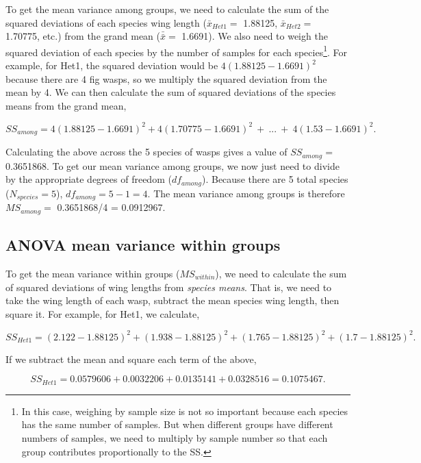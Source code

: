 \documentclass[
]{scrbook}
\begin{document}
To get the mean variance among groups, we need to calculate the sum of the squared deviations of each species wing length (\(\bar{x}_{Het1} =\) 1.88125, \(\bar{x}_{Het2} =\) 1.70775, etc.) from the grand mean (\(\bar{\bar{x}} =\) 1.6691).
We also need to weigh the squared deviation of each species by the number of samples for each species\footnote{In this case, weighing by sample size is not so important because each species has the same number of samples. But when different groups have different numbers of samples, we need to multiply by sample number so that each group contributes proportionally to the SS.}.
For example, for Het1, the squared deviation would be \(4(1.88125 - 1.6691)^{2}\) because there are 4 fig wasps, so we multiply the squared deviation from the mean by 4.
We can then calculate the sum of squared deviations of the species means from the grand mean,

\[SS_{among} = 4(1.88125 - 1.6691)^{2} + 
               4(1.70775 - 1.6691)^{2}\:+\: ... \:
               +\:4(1.53 - 1.6691)^{2}.\]

Calculating the above across the 5 species of wasps gives a value of \(SS_{among} =\) 0.3651868.
To get our mean variance among groups, we now just need to divide by the appropriate degrees of freedom (\(df_{among}\)).
Because there are 5 total species (\(N_{species} = 5\)), \(df_{among} = 5 - 1 = 4\).
The mean variance among groups is therefore \(MS_{among} =\) 0.3651868/4 = 0.0912967.

\hypertarget{anova-mean-variance-within-groups}{%
\subsection{ANOVA mean variance within groups}\label{anova-mean-variance-within-groups}}

To get the mean variance within groups (\(MS_{within}\)), we need to calculate the sum of squared deviations of wing lengths from \emph{species means}.
That is, we need to take the wing length of each wasp, subtract the mean species wing length, then square it.
For example, for Het1, we calculate,

\[SS_{Het1} = (2.122 - 1.88125)^{2} + 
              (1.938 - 1.88125)^{2} +
              (1.765 - 1.88125)^{2} +
              (1.7 - 1.88125)^{2}.\]

If we subtract the mean and square each term of the above,

\[SS_{Het1} = 0.0579606 + 
              0.0032206 +
              0.0135141 +
              0.0328516 = 0.1075467.\]
\end{document}

